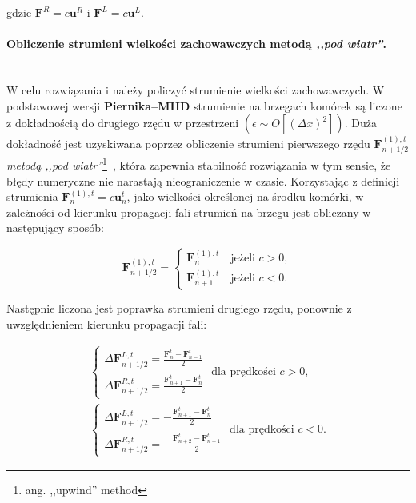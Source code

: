gdzie $\mathbf{F}^R=c \mathbf{u}^R$ i $\mathbf{F}^L=c \mathbf{u}^L$. 

\paragraph{Obliczenie strumieni wielkości zachowawczych metodą \emph{,,pod wiatr''}.}~\\

W celu rozwiązania  i  należy policzyć strumienie
wielkości zachowawczych. W podstawowej wersji \textbf{Piernika--MHD} strumienie
na brzegach komórek są liczone z dokładnością do drugiego rzędu w przestrzeni
$\left(\epsilon \sim O\left[(\Delta x)^2\right]\right).$ Duża dokładność jest
uzyskiwana poprzez obliczenie strumieni pierwszego rzędu
$\mathbf{F}^{(1),t}_{n+1/2}$ \emph{metodą ,,pod wiatr''}\footnote{ang.
,,upwind'' method}~\cite{cir}, która zapewnia stabilność rozwiązania w tym
sensie, że błędy numeryczne nie narastają nieograniczenie w czasie.  Korzystając
z definicji strumienia $\mathbf{F}_n^{(1),t}=c \mathbf{u}_n^t$, jako wielkości
określonej na środku komórki, w zależności od kierunku propagacji fali strumień
na brzegu jest obliczany w następujący sposób:

\begin{equation}
   \mathbf{F}^{(1),t}_{n+1/2} = 
   \begin{cases}
      \mathbf{F}^{(1),t}_{n}  \quad \textrm{jeżeli }c>0,\\
      \mathbf{F}^{(1),t}_{n+1}\quad \textrm{jeżeli }c<0.
   \end{cases}
\end{equation}

Następnie liczona jest poprawka strumieni drugiego rzędu, ponownie z
uwzględnieniem kierunku propagacji fali:

\begin{align} \label{lab1}
   \begin{cases} 
      \Delta \mathbf{F}^{L,t}_{n+1/2} = \frac{\mathbf{F}^t_{n} - \mathbf{F}^t_{n-1}}{2} \\
      \Delta \mathbf{F}^{R,t}_{n+1/2} = \frac{\mathbf{F}^t_{n+1} - \mathbf{F}^t_{n}}{2}
   \end{cases} \textrm{ dla prędkości }c>0,\\
   \label{lab2}\begin{cases} 
   \Delta \mathbf{F}^{L,t}_{n+1/2} = -\frac{\mathbf{F}^t_{n+1} - \mathbf{F}^t_{n}}{2} \\
   \Delta \mathbf{F}^{R,t}_{n+1/2} = -\frac{\mathbf{F}^t_{n+2} - \mathbf{F}^t_{n+1}}{2}
   \end{cases} \textrm{ dla prędkości }c<0.
\end{align}

